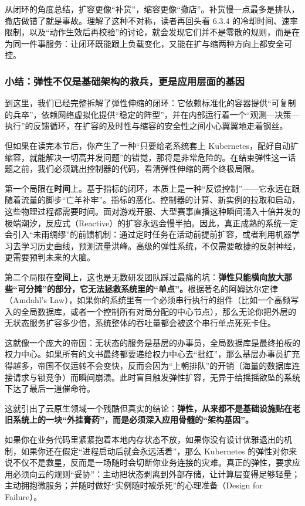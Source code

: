 从闭环的角度总结，扩容更像“补货”，缩容更像“撤店”。补货慢一点最多是排队，撤店做错了就是事故。理解了这种不对称，读者再回头看 6.3.4 的冷却时间、速率限制，以及“动作生效后再校验”的讨论，就会发现它们并不是零散的规则，而是在为同一件事服务：让闭环既能跟上负载变化，又能在扩与缩两种方向上都安全可控。


\subsubsection{小结：弹性不仅是基础架构的救兵，更是应用层面的基因}

到这里，我们已经完整拆解了弹性伸缩的闭环：它依赖标准化的容器提供“可复制的兵卒”，依赖网络虚拟化提供“稳定的阵型”，并在内部运行着一个“观测—决策—执行”的反馈循环，在扩容的及时性与缩容的安全性之间小心翼翼地走着钢丝。

但如果在读完本节后，你产生了一种“只要给老系统套上 Kubernetes，配好自动扩缩容，就能解决一切高并发问题”的错觉，那将是非常危险的。在结束弹性这一话题之前，我们必须跳出控制器的代码，看清弹性伸缩的两个终极局限。

第一个局限在\textbf{时间}上。基于指标的闭环，本质上是一种“反馈控制”——它永远在跟随着流量的脚步“亡羊补牢”。指标的恶化、控制器的计算、新实例的拉取和启动，这些物理过程都需要时间。面对游戏开服、大型赛事直播这种瞬间涌入十倍并发的极端潮汐，反应式（Reactive）的扩容永远会慢半拍。因此，真正成熟的系统一定会引入“未雨绸缪”的前馈机制：通过定时任务在活动前提前扩容，或者利用机器学习去学习历史曲线，预测流量洪峰。高级的弹性系统，不仅需要敏捷的反射神经，更需要预判未来的大脑。

第二个局限在\textbf{空间}上，这也是无数研发团队踩过最痛的坑：\textbf{弹性只能横向放大那些“可分摊”的部分，它无法拯救系统里的“单点”。}根据著名的阿姆达尔定律（Amdahl's Law），如果你的系统里有一个必须串行执行的组件（比如一个高频写入的全局数据库，或者一个控制所有对局分配的中心节点），那么无论你把外层的无状态服务扩容多少倍，系统整体的吞吐量都会被这个串行单点死死卡住。

这就像一个庞大的帝国：无状态的服务是基层的办事员，全局数据库是最终拍板的权力中心。如果所有的文书最终都要递给权力中心去“批红”，那么基层办事员扩充得越多，帝国不仅运转不会变快，反而会因为“上朝排队”的开销（海量的数据库连接请求与锁竞争）而瞬间崩溃。此时盲目触发弹性扩容，无异于给摇摇欲坠的系统下达了最后一道催命符。

这就引出了云原生领域一个残酷但真实的结论：\textbf{弹性，从来都不是基础设施贴在老旧系统上的一块“外挂膏药”，而是必须深入应用骨髓的“架构基因”。}

如果你在业务代码里紧紧抱着本地内存状态不放，如果你没有设计优雅退出的机制，如果你还在假定“进程启动后就会永远活着”，那么 Kubernetes 的弹性对你来说不仅不是救星，反而是一场随时会切断你业务连接的灾难。真正的弹性，要求应用必须向云的规则“妥协”：主动把状态剥离到外部存储，让计算层变得足够轻量；主动拥抱微服务；并随时做好“实例随时被杀死”的心理准备（Design for Failure）。

